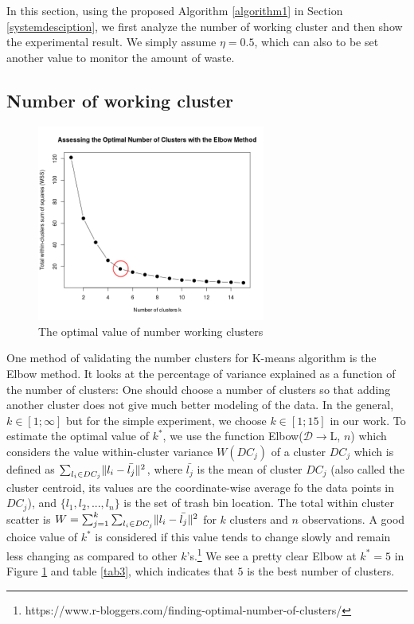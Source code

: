 \documentclass[conference]{IEEEtran}
\DeclarePairedDelimiter{\norm}{\lVert}{\rVert}
\begin{document}
In this section, using the proposed Algorithm \ref{algorithm1} in Section \ref{systemdesciption}, we first analyze the number of working cluster and then show the experimental result. We simply assume $\eta = 0.5$, which can also to be set another value to monitor the amount of waste. 

\subsection{Number of working cluster}

\begin{figure}
	\centering
	\includegraphics[width=7.5cm]{elbow6}
	\caption{The optimal value of number working clusters}
	\label{fig3}
\end{figure}



One  method of validating the number clusters for K-means algorithm is the Elbow method. It looks at the percentage of variance explained as a function of the number of clusters: One should choose a number of clusters so that adding another cluster does not give much better modeling of the data. In the general, $k \in [1;\infty]$ but for the simple experiment, we choose $k\in[1;15]$ in our work. To estimate the optimal value of $k^*$, we use the function Elbow($\mathcal{D}\rightarrow$L, $n$) which considers the value within-cluster variance $W(DC_j)$ of a cluster $DC_j$ which is defined as $\sum_{l_i\in DC_j}\norm{l_i-\bar{l_j}}^2$, where $\bar{l_j}$ is the mean of cluster $DC_j$ (also called the cluster centroid, its values are the coordinate-wise average fo the data points in $DC_j$), and $\{l_1, l_2,..., l_n\}$ is the set of trash bin location. The total within cluster scatter is $W = \sum_{j=1}^{k}\sum_{l_i\in DC_j}\norm{l_i-\bar{l_j}}^2$ for $k$ clusters and $n$ observations. A good choice value of $k^*$ is considered if this value tends to change slowly and remain less changing as compared to other $k$'s.\footnote{https://www.r-bloggers.com/finding-optimal-number-of-clusters/} We see a pretty clear Elbow at $k^* = 5$ in Figure \ref{fig3} and table \ref{tab3}, which indicates that $5$ is the best number of clusters.
\end{document}
